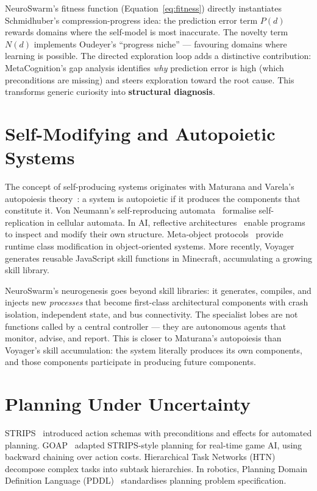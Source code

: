 \documentclass[12pt,a4paper]{report}
\begin{document}
NeuroSwarm's fitness function (Equation~\ref{eq:fitness}) directly instantiates Schmidhuber's compression-progress idea: the prediction error term $P(d)$ rewards domains where the self-model is most inaccurate. The novelty term $N(d)$ implements Oudeyer's ``progress niche'' --- favouring domains where learning is possible. The directed exploration loop adds a distinctive contribution: MetaCognition's gap analysis identifies \emph{why} prediction error is high (which preconditions are missing) and steers exploration toward the root cause. This transforms generic curiosity into \textbf{structural diagnosis}.

\section{Self-Modifying and Autopoietic Systems}

The concept of self-producing systems originates with Maturana and Varela's autopoiesis theory~\cite{maturana1980autopoiesis}: a system is autopoietic if it produces the components that constitute it. Von Neumann's self-reproducing automata~\cite{vonneumann1966selfreproducing} formalise self-replication in cellular automata. In AI, reflective architectures~\cite{maes1988computational} enable programs to inspect and modify their own structure. Meta-object protocols~\cite{kiczales1991art} provide runtime class modification in object-oriented systems. More recently, Voyager~\cite{wang2023voyager} generates reusable JavaScript skill functions in Minecraft, accumulating a growing skill library.

NeuroSwarm's neurogenesis goes beyond skill libraries: it generates, compiles, and injects new \emph{processes} that become first-class architectural components with crash isolation, independent state, and bus connectivity. The specialist lobes are not functions called by a central controller --- they are autonomous agents that monitor, advise, and report. This is closer to Maturana's autopoiesis than Voyager's skill accumulation: the system literally produces its own components, and those components participate in producing future components.

\section{Planning Under Uncertainty}

STRIPS~\cite{fikes1971strips} introduced action schemas with preconditions and effects for automated planning. GOAP~\cite{orkin2006goap} adapted STRIPS-style planning for real-time game AI, using backward chaining over action costs. Hierarchical Task Networks (HTN)~\cite{erol1994htn} decompose complex tasks into subtask hierarchies. In robotics, Planning Domain Definition Language (PDDL)~\cite{mcdermott1998pddl} standardises planning problem specification.
\end{document}
